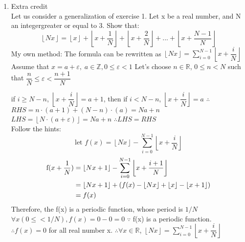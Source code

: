 \documentclass{article}
\theoremstyle{definition}
\theoremstyle{plain}
\providecommand{\floor}[1]{\left \lfloor #1 \right \rfloor }
\begin{document}
\begin {enumerate}[itemindent=30pt,label=\bf Exercise {\arabic*}:]
\item Extra credit\\
Let us consider a generalization of exercise 1. Let x be a real number, and N an integergreater or equal to 3. Show that:
$$\floor{Nx} = \floor{x} + \floor{x + \dfrac{1}{N}} + \floor{x + \dfrac{2}{N}} + ... +  \floor{x + \dfrac{N-1}{N}} $$
\subitem My own method:
\subitem The formula can be rewritten as $ \floor{Nx} = \sum \limits_{i=0}^{N-1} \floor{x + \dfrac{i}{N}}$
\subitem Assume that $x = a + \varepsilon,\; a \in \mathbb{Z}, 0 \leqslant \varepsilon < 1 $ 
\subitem Let's choose $n \in \mathbb{R}$, $0 \leqslant n < N$ such that $\dfrac{n}{N} \leq \varepsilon < \dfrac{n+1}{N}$

\subitem if $i \geq N- n$, $\floor{x + \dfrac{i}{N}} = a + 1$, then if $i < N -n$, $\floor{x + \dfrac{i}{N}} = a$
\subitem $\therefore$ $RHS = n\cdot (a + 1) + (N-n)\cdot(a) = Na + n$
\subitem $LHS = \floor{N\cdot(a + \varepsilon)} = Na + n$
\subitem $\therefore LHS = RHS$\\

\subitem Follow the hints:
$$\text{let } f(x) =  \floor{Nx} - \sum \limits_{i=0}^{N-1} \floor{x + \dfrac{i}{N}}$$
\begin{align*}
\text f(x + \dfrac{1}{N}) &= \floor{Nx+1} - \sum \limits_{i=0}^{N-1} \floor{x + \dfrac{i+1}{N}} \\
	&= \floor{Nx+1} + (f(x) - \floor{Nx} + \floor{x} - \floor{x + 1})\\
	&= f(x)
\end{align*}
\subitem Therefore, the f(x) is a periodic function, whose  period is $1/N$
\subitem $\forall x ( 0 \leqslant < 1/N),  f(x) = 0 - 0 = 0$
\subitem $\because$ f(x) is a periodic function.
\subitem $\therefore f(x) = 0$ for all real number x.
\subitem $\therefore \forall x \in \mathbb{R}$, $\floor{Nx} = \sum \limits_{i=0}^{N-1} \floor{x + \dfrac{i}{N}}$
\end{enumerate}
\end{document}
